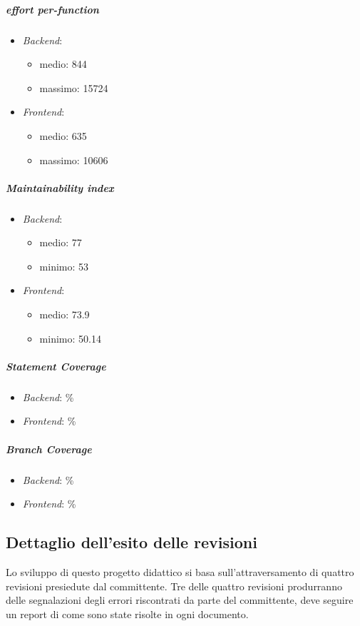 	\subparagraph{ effort per-function}
	\begin{itemize}
		\item \emph{Backend}: 
		\begin{itemize}
			\item medio: 844
			\item massimo: 15724
		\end{itemize}
		\item \emph{Frontend}: 
		\begin{itemize}
			\item medio: 635
			\item massimo: 10606
		\end{itemize} 
	\end{itemize}


	\subparagraph{Maintainability index}
	\begin{itemize}
		\item \emph{Backend}: 
		\begin{itemize}
			\item medio: 77
			\item minimo: 53
		\end{itemize} 
		\item \emph{Frontend}: 
		\begin{itemize}
			\item medio: 73.9
			\item minimo: 50.14
		\end{itemize} 
	\end{itemize}


	\subparagraph{Statement Coverage}
	\begin{itemize}
		\item \emph{Backend}: \%
		\item \emph{Frontend}: \%
	\end{itemize}
	

	\subparagraph{Branch Coverage}
	\begin{itemize}
		\item \emph{Backend}: \%
		\item \emph{Frontend}: \%
	\end{itemize}

	


	\subsection{Dettaglio dell'esito delle revisioni}
	Lo sviluppo di questo progetto didattico si basa sull'attraversamento di quattro revisioni presiedute dal committente. Tre delle quattro revisioni produrranno delle segnalazioni degli errori riscontrati da parte del committente, deve seguire un report di come sono state risolte in ogni documento.
		

